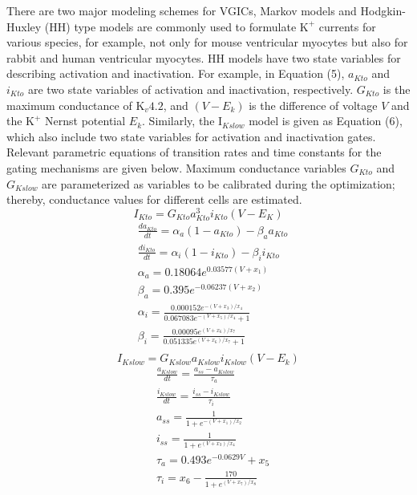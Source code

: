 \documentclass[journal]{IEEEtran}
\begin{document}
There are two major modeling schemes for VGICs, Markov models and Hodgkin-Huxley (HH) type models are commonly used to formulate $\text{K}^{+}$ currents for various species, for example, not only for mouse ventricular myocytes but also for rabbit and human ventricular myocytes. HH models have two state variables for describing activation and inactivation. For example, in Equation (5), $a_{Kto}$ and $i_{Kto}$ are two state variables of activation and inactivation, respectively. $G_{Kto}$ is the maximum conductance of $\text{K}_{v}4.2$, and $(V-E_k)$ is the difference of voltage $V$ and the $\text{K}^{+}$ Nernst potential $E_k$. Similarly, the $\text{I}_{Kslow}$ model is given as Equation (6), which also include two state variables for activation and inactivation gates. Relevant parametric equations of transition rates and time constants for the gating mechanisms are given below. Maximum conductance variables $G_{Kto}$ and $G_{Kslow}$ are parameterized as variables to be calibrated during the optimization; thereby, conductance values for different cells are estimated.
\begin{equation}
    I_{Kto} = G_{Kto}a_{Kto}^{3}i_{Kto}(V-E_K)
\end{equation}
\begin{align*}
    &\frac{da_{Kto}}{dt} = \alpha_{a}(1-a_{Kto}) - \beta_{a}a_{Kto} \\
    & \frac{di_{Kto}}{dt} = \alpha_i(1-i_{Kto}) - \beta_i i_{Kto} \\
    &\alpha_a = 0.18064 e^{0.03577(V+x_1)} \\
    &\beta_a = 0.395 e^{-0.06237(V+x_2)} \\
    &\alpha_i = \frac{0.000152 e^{-(V+x_3)/x_4}}{0.067083 e^{-(V + x_5)/x_4} + 1} \\
    &\beta_i = \frac{0.00095 e^{(V+x_6)/x_7}}{0.051335 e^{(V+x_6)/x_7} + 1} \\
\end{align*}
\begin{equation}
    I_{Kslow} = G_{Kslow}a_{Kslow}i_{Kslow}(V-E_k)
\end{equation}
\begin{align*}
    &\frac{a_{Kslow}}{dt} = \frac{a_{ss}-a_{Kslow}}{\tau_{a}} \\
    &\frac{i_{Kslow}}{dt} = \frac{i_{ss}-i_{Kslow}}{\tau_{i}} \\
    &a_{ss} = \frac{1}{1+e^{-(V+x_1)/x_2}} \\
    &i_{ss} = \frac{1}{1+e^{(V+x_3)/x_4}} \\
    &\tau_{a} = 0.493 e^{-0.0629V}+x_5 \\
    &\tau_{i} = x_6 - \frac{170}{1+e^{(V+x_7)/x_8}}
\end{align*}
\end{document}
